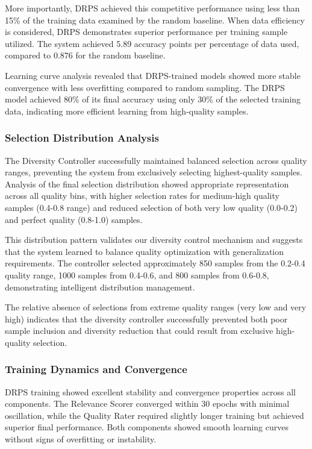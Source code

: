 \documentclass[12pt]{article}
\begin{document}
More importantly, DRPS achieved this competitive performance using less than 15\% of the training data examined by the random baseline. When data efficiency is considered, DRPS demonstrates superior performance per training sample utilized. The system achieved 5.89 accuracy points per percentage of data used, compared to 0.876 for the random baseline.

Learning curve analysis revealed that DRPS-trained models showed more stable convergence with less overfitting compared to random sampling. The DRPS model achieved 80\% of its final accuracy using only 30\% of the selected training data, indicating more efficient learning from high-quality samples.

\subsubsection{Selection Distribution Analysis}\label{selection-distribution}

The Diversity Controller successfully maintained balanced selection across quality ranges, preventing the system from exclusively selecting highest-quality samples. Analysis of the final selection distribution showed appropriate representation across all quality bins, with higher selection rates for medium-high quality samples (0.4-0.8 range) and reduced selection of both very low quality (0.0-0.2) and perfect quality (0.8-1.0) samples.

This distribution pattern validates our diversity control mechanism and suggests that the system learned to balance quality optimization with generalization requirements. The controller selected approximately 850 samples from the 0.2-0.4 quality range, 1000 samples from 0.4-0.6, and 800 samples from 0.6-0.8, demonstrating intelligent distribution management.

The relative absence of selections from extreme quality ranges (very low and very high) indicates that the diversity controller successfully prevented both poor sample inclusion and diversity reduction that could result from exclusive high-quality selection.

\subsubsection{Training Dynamics and Convergence}\label{training-dynamics}

DRPS training showed excellent stability and convergence properties across all components. The Relevance Scorer converged within 30 epochs with minimal oscillation, while the Quality Rater required slightly longer training but achieved superior final performance. Both components showed smooth learning curves without signs of overfitting or instability.
\end{document}
